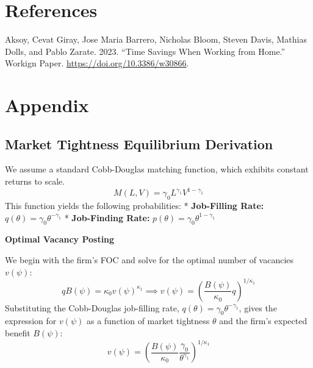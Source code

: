 \documentclass[
  11pt,
  letterpaper,
  DIV=11,
  numbers=noendperiod]{scrartcl}
\newlength{\cslhangindent}
\newenvironment{CSLReferences}[2] %
 {\begin{list}{}{%
  \setlength{\itemindent}{0pt}
  \setlength{\leftmargin}{0pt}
  \setlength{\parsep}{0pt}
  \ifodd #1
   \setlength{\leftmargin}{\cslhangindent}
   \setlength{\itemindent}{-1\cslhangindent}
  \fi
  \setlength{\itemsep}{#2\baselineskip}}}
 {\end{list}}
\begin{document}
\section*{References}\label{references}

\label{refs}
\begin{CSLReferences}{1}{0}
Aksoy, Cevat Giray, Jose Maria Barrero, Nicholas Bloom, Steven Davis,
Mathias Dolls, and Pablo Zarate. 2023. {``Time {Savings When Working}
from {Home}.''} Workign Paper. \url{https://doi.org/10.3386/w30866}.

\end{CSLReferences}

\newpage

\setcounter{section}{0}
\renewcommand{\thesection}{\Alph{section}}

\setcounter{table}{0}
\renewcommand{\thetable}{A\arabic{table}}

\setcounter{figure}{0}
\renewcommand{\thefigure}{A\arabic{figure}}

\section{Appendix}\label{appendix}

\subsection{Market Tightness Equilibrium
Derivation}\label{sec-appendix-cobb-douglas}

We assume a standard Cobb-Douglas matching function, which exhibits
constant returns to scale. \[
M(L, V) = \gamma_{0} L^{\gamma_{1}} V^{1-\gamma_{1}}
\] This function yields the following probabilities: *
\textbf{Job-Filling Rate:}
\(q(\theta) = \gamma_{0} \theta^{-\gamma_{1}}\) * \textbf{Job-Finding
Rate:} \(p(\theta) = \gamma_{0} \theta^{1-\gamma_{1}}\)

\textbf{Optimal Vacancy Posting}

We begin with the firm's FOC and solve for the optimal number of
vacancies \(v(\psi)\): \[
q B(\psi) = \kappa_{0} v(\psi)^{\kappa_{1}} \implies v(\psi) = \left( \frac{B(\psi)}{\kappa_{0}} q \right)^{1/\kappa_{1}}
\] Substituting the Cobb-Douglas job-filling rate,
\(q(\theta) = \gamma_{0} \theta^{-\gamma_{1}}\), gives the expression
for \(v(\psi)\) as a function of market tightness \(\theta\) and the
firm's expected benefit \(B(\psi)\): \[
v(\psi) = \left( \frac{B(\psi)}{\kappa_{0}} \frac{\gamma_{0}}{\theta^{\gamma_{1}}} \right)^{1/\kappa_{1}}
\]
\end{document}
